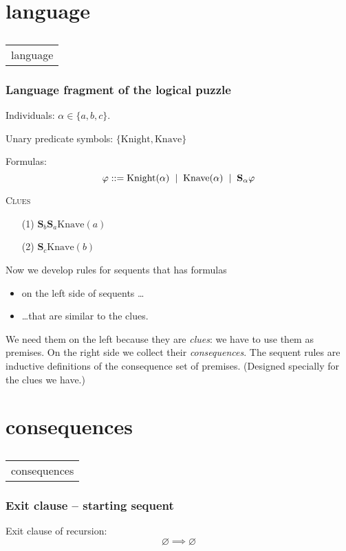 \documentclass[xcolor=x11names]{beamer}
\makeatletter
\let\beamer@writeslidentry@miniframeson=\beamer@writeslidentry
\def\beamer@writeslidentry@miniframesoff{%
  \expandafter\beamer@ifempty\expandafter{\beamer@framestartpage}{}%
  {%
    \clearpage\beamer@notesactions%
  }
}
\newcommand*{\miniframeson}{\let\beamer@writeslidentry=\beamer@writeslidentry@miniframeson}
\newcommand*{\miniframesoff}{\let\beamer@writeslidentry=\beamer@writeslidentry@miniframesoff}
\newcommand{\cimdia}[1] {\miniframesoff \begin{frame}\begin{center}\huge \begin{tabular}{c}#1\end{tabular}\end{center}\end{frame}\miniframeson}
\newcommand{\szakasz}[2][]{\section{#1}\subsection{}\cimdia{#2}}
\newcommand{\bemph}[1] {{\color{DeepSkyBlue3}{#1}}}
\newcommand{\vonal} [1][.2]{\hspace{#1cm} | \hspace{#1cm}}
\newcommand{\says}[1]{\mathbf{S}_{#1}}
\newcommand{\isa}[2]{\mathrm{#2}(#1)}
\makeatother
\begin{document}
\szakasz[language]{language}
\begin{frame}
  \frametitle{Language fragment of the logical puzzle}
Individuals: $\alpha \in \{a,b,c\}$.
\bigskip

Unary predicate symbols: $\{\mathrm{Knight}, \mathrm{Knave}\}$

\bigskip
Formulas: \[\varphi ::= \mathrm{Knight}(\alpha)\vonal \mathrm{Knave}(\alpha) \vonal \says\alpha\varphi\]

\bigskip
\bemph{Note that there is no negation in the language, but instead we have two predicates instead of one that are complements of each other!}
\vfill

\textsc{Clues}
\begin{itemize}
\item[(1)]  $\says b\says a\isa{a}{Knave}$
\item[(2)]  $\says c\isa{b}{Knave}$
\end{itemize}

Now we develop rules for sequents that has formulas
\begin{itemize}
  \item on the left side of sequents \dots
  \item \dots that are similar to the clues.
\end{itemize}

We need them on the left because they are \emph{clues}: we have to use them as premises. On the right side we collect their \emph{consequences}. The sequent rules are inductive definitions of the consequence set of premises. (Designed specially for the clues we have.)
\end{frame}


\szakasz[consequences]{consequences}
\begin{frame}
  \frametitle{Exit clause -- starting sequent}
Exit clause of recursion: \[ \varnothing \implies \varnothing \tag{R0}\]
\end{frame}
\end{document}
